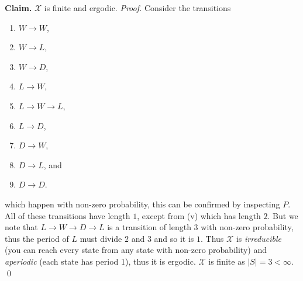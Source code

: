 \begin{solution}
    \vspace{0.5em}
    \textbf{Claim.} $\mathcal X$ is finite and ergodic.
    \vspace{0.5em}
    \textit{Proof.} Consider the transitions
    \begin{enumerate}
        \item $W \to W$,
        \item $W \to L$,
        \item $W \to D$,
        \item $L \to W$,
        \item $L \to W \to L$,
        \item $L \to D$,
        \item $D \to W$,
        \item $D \to L$, and
        \item $D \to D$.
    \end{enumerate}
    which happen with non-zero probability, this can be confirmed by inspecting $P$. All of these transitions have length $1$, except from (v) which has length $2$. But we note that $L \to W \to D \to L$ is a transition of length $3$ with non-zero probability, thus the period of $L$ must divide $2$ and $3$ and so it is $1$. Thus $\mathcal X$ is \emph{irreducible} (you can reach every state from any state with non-zero probability) and \emph{aperiodic} (each state has period 1), thus it is ergodic. $\mathcal X$ is finite as $\lvert S \rvert = 3 < \infty$.
    \qed
    \vspace{0.5em}


\end{solution}
